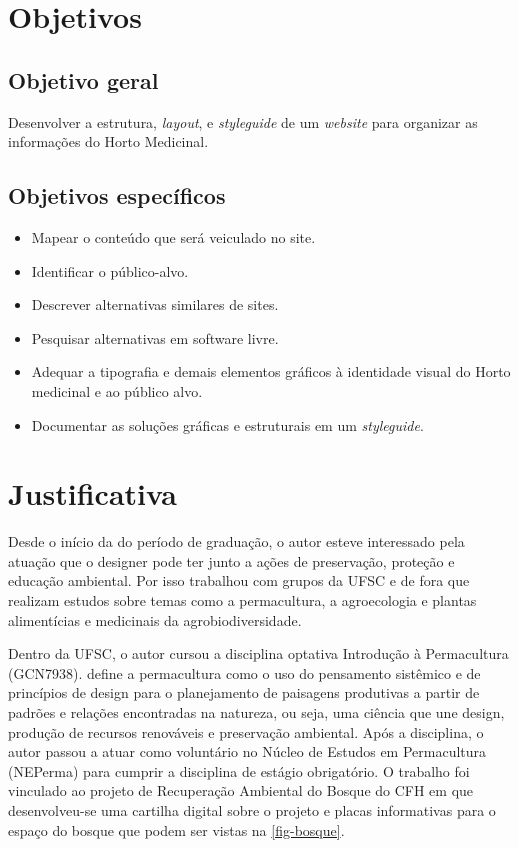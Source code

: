 \section{Objetivos}\label{objetivos}

\subsection{Objetivo geral}\label{objetivo-geral}

Desenvolver a estrutura, \emph{layout}, e \emph{styleguide} de um \emph{website} para organizar as informações do Horto Medicinal.

\subsection{Objetivos específicos}\label{objetivos-especificos}

\begin{itemize}
\item
  Mapear o conteúdo que será veiculado no site.
\item
  Identificar o público-alvo.
\item
  Descrever alternativas similares de sites.
\item
  Pesquisar alternativas em software livre.
\item
  Adequar a tipografia e demais elementos gráficos à identidade visual do Horto medicinal e ao público alvo.
\item
  Documentar as soluções gráficas e estruturais em um \emph{styleguide}.
\end{itemize}

\section{Justificativa}\label{justificativa}

Desde o início da do período de graduação, o autor esteve interessado pela atuação que o designer pode ter junto a ações de preservação, proteção e educação ambiental. Por isso trabalhou com grupos da UFSC e de fora que realizam estudos sobre temas como a permacultura, a agroecologia e plantas alimentícias e medicinais da agrobiodiversidade.

Dentro da UFSC, o autor cursou a disciplina optativa Introdução à Permacultura (GCN7938).\textcite[33]{holmgren13} define a permacultura como o uso do pensamento sistêmico e de princípios de design para o planejamento de paisagens produtivas a partir de padrões e relações encontradas na natureza, ou seja, uma ciência que une design, produção de recursos renováveis e preservação ambiental. Após a disciplina, o autor passou a atuar como voluntário no Núcleo de Estudos em Permacultura (NEPerma) para cumprir a disciplina de estágio obrigatório. O trabalho foi vinculado ao projeto de Recuperação Ambiental do Bosque do CFH em que desenvolveu-se uma cartilha digital sobre o projeto e placas informativas para o espaço do bosque que podem ser vistas na \autoref{fig-bosque}.

